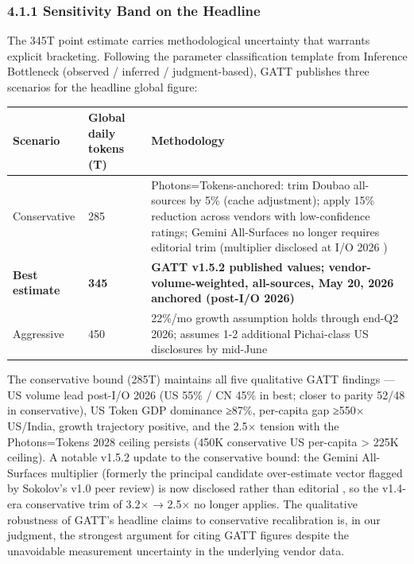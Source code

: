 \documentclass[11pt,a4paper]{article}
\begin{document}
\subsubsection{4.1.1 Sensitivity Band on the Headline}

The 345T point estimate carries methodological uncertainty that warrants explicit bracketing. Following the parameter classification template from Inference Bottleneck \cite{inference2026bottleneck} (observed / inferred / judgment-based), GATT publishes three scenarios for the headline global figure:

\begin{center}
\begin{tabular}{lll}
\toprule
Scenario & Global daily tokens (T) & Methodology \\
\midrule
Conservative & 285 & Photons=Tokens-anchored: trim Doubao all-sources by 5\% (cache adjustment); apply 15\% reduction across vendors with low-confidence ratings; Gemini All-Surfaces no longer requires editorial trim (multiplier disclosed at I/O 2026 \cite{pichai2026io}) \\
\textbf{Best estimate} & \textbf{345} & \textbf{GATT v1.5.2 published values; vendor-volume-weighted, all-sources, May 20, 2026 anchored (post-I/O 2026)} \\
Aggressive & 450 & 22\%/mo growth assumption holds through end-Q2 2026; assumes 1-2 additional Pichai-class US disclosures by mid-June \\
\bottomrule
\end{tabular}
\end{center}


The conservative bound (285T) maintains all five qualitative GATT findings --- US volume lead post-I/O 2026 (US 55\% / CN 45\% in best; closer to parity 52/48 in conservative), US Token GDP dominance ≥87\%, per-capita gap ≥550× US/India, growth trajectory positive, and the 2.5× tension with the Photons=Tokens 2028 ceiling persists (450K conservative US per-capita > 225K ceiling). A notable v1.5.2 update to the conservative bound: the Gemini All-Surfaces multiplier (formerly the principal candidate over-estimate vector flagged by Sokolov's v1.0 peer review) is now disclosed rather than editorial \cite{pichai2026io}, so the v1.4-era conservative trim of 3.2× → 2.5× no longer applies. The qualitative robustness of GATT's headline claims to conservative recalibration is, in our judgment, the strongest argument for citing GATT figures despite the unavoidable measurement uncertainty in the underlying vendor data.
\end{document}
